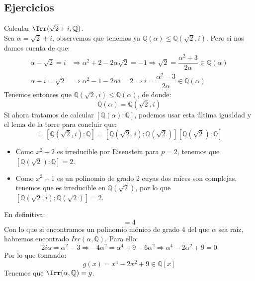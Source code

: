\subsection{Ejercicios}
\begin{ejercicio}
    Calcular $\Irr(\sqrt{2}+i,\mathbb{Q})$.\\ 

    \noindent
    Sea $\alpha = \sqrt{2}+i$, observemos que tenemos ya $\mathbb{Q}(\alpha)\leq \mathbb{Q}(\sqrt{2},i)$. Pero si nos damos cuenta de que:
    \begin{align*}
        \alpha-\sqrt{2} = i &\Longrightarrow \alpha^2+2-2\alpha\sqrt{2} = -1 \Longrightarrow \sqrt{2} = \dfrac{\alpha^2+3}{2\alpha} \in \mathbb{Q}(\alpha) \\
        \alpha-i = \sqrt{2} &\Longrightarrow \alpha^2-1-2\alpha i = 2 \Longrightarrow i = \dfrac{\alpha^2-3}{2\alpha}\in \mathbb{Q}(\alpha)
    \end{align*}
    Tenemos entonces que $\mathbb{Q}(\sqrt{2},i)\leq \mathbb{Q}(\alpha)$, de donde:
    \begin{equation*}
        \mathbb{Q}(\alpha) = \mathbb{Q}(\sqrt{2},i)
    \end{equation*}
    Si ahora tratamos de calcular $[\mathbb{Q}(\alpha):\mathbb{Q}]$, podemos usar esta última igualdad y el lema de la torre para concluir que:
    \begin{equation*}
        [\mathbb{Q}(\alpha):\mathbb{Q}] = [\mathbb{Q}(\sqrt{2},i):\mathbb{Q}] = [\mathbb{Q}(\sqrt{2},i):\mathbb{Q}(\sqrt{2})][\mathbb{Q}(\sqrt{2}):\mathbb{Q}]
    \end{equation*}
    \begin{itemize}
        \item Como $x^2-2$ es irreducible por Eisenstein para $p=2$, tenemos que \newline $[\mathbb{Q}(\sqrt{2}):\mathbb{Q}]=2$.
        \item Como $x^2+1$ es un polinomio de grado 2 cuyas dos raíces son complejas, tenemos que es irreducible en $\mathbb{Q}(\sqrt{2})$, por lo que $[\mathbb{Q}(\sqrt{2},i):\mathbb{Q}(\sqrt{2})]=2$.
    \end{itemize}
    En definitiva:
    \begin{equation*}
        [\mathbb{Q}(\alpha):\mathbb{Q}] = 4
    \end{equation*}
    Con lo que si encontramos un polinomio mónico de grado 4 del que $\alpha$ sea raíz, habremos encontrado $Irr(\alpha,\mathbb{Q})$. Para ello:
    \begin{equation*}
        2i\alpha = \alpha^2 -3 \Longrightarrow -4\alpha^2 = \alpha^4 + 9 - 6\alpha^2 \Longrightarrow \alpha^4 -2\alpha^2+9 = 0
    \end{equation*}
    Por lo que tomando:
    \begin{equation*}
        g(x) = x^4-2x^2+9 \in \mathbb{Q}[x]
    \end{equation*}
    Tenemos que $\Irr(\alpha,\mathbb{Q}) = g$.
\end{ejercicio}

